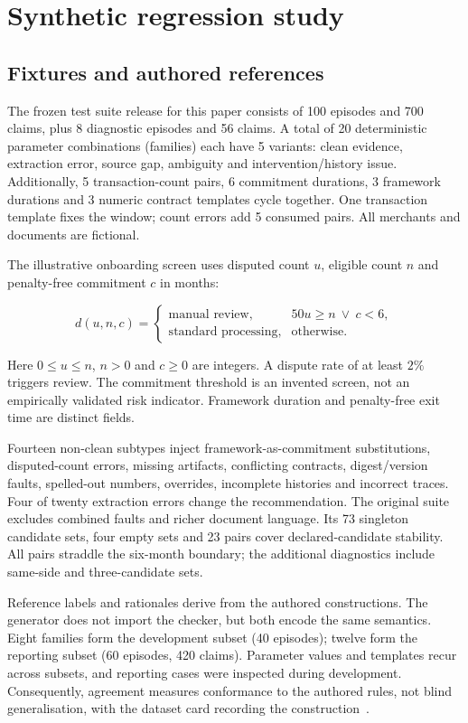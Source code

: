 \documentclass[sigconf,nonacm]{acmart}
\begin{document}
\section{Synthetic regression study}

\subsection{Fixtures and authored references}

The frozen test suite release for this paper consists of 100 episodes and 700 claims, plus 8 diagnostic episodes and 56 claims. A total of 20 deterministic parameter combinations (families) each have 5 variants: clean evidence, extraction error, source gap, ambiguity and intervention/history issue. Additionally, 5 transaction-count pairs, 6 commitment durations, 3 framework durations and 3 numeric contract templates cycle together. One transaction template fixes the window; count errors add 5 consumed pairs. All merchants and documents are fictional.

The illustrative onboarding screen uses disputed count \(u\), eligible count \(n\) and penalty-free commitment \(c\) in months:

\begin{equation}
d(u,n,c)=
\begin{cases}
\text{manual review}, & 50u\geq n\ \lor\ c<6,\\
\text{standard processing}, & \text{otherwise}.
\end{cases}
\end{equation}

Here \(0\leq u\leq n\), \(n>0\) and \(c\geq0\) are integers. A dispute rate of at least \(2\%\) triggers review. The commitment threshold is an invented screen, not an empirically validated risk indicator. Framework duration and penalty-free exit time are distinct fields.

Fourteen non-clean subtypes inject framework-as-commitment substitutions, disputed-count errors, missing artifacts, conflicting contracts, digest/version faults, spelled-out numbers, overrides, incomplete histories and incorrect traces. Four of twenty extraction errors change the recommendation. The original suite excludes combined faults and richer document language. Its 73 singleton candidate sets, four empty sets and 23 pairs cover declared-candidate stability. All pairs straddle the six-month boundary; the additional diagnostics include same-side and three-candidate sets.

Reference labels and rationales derive from the authored constructions. The generator does not import the checker, but both encode the same semantics. Eight families form the development subset (40 episodes); twelve form the reporting subset (60 episodes, 420 claims). Parameter values and templates recur across subsets, and reporting cases were inspected during development. Consequently, agreement measures conformance to the authored rules, not blind generalisation, with the dataset card recording the construction~\cite{gebru2021}.
\end{document}
